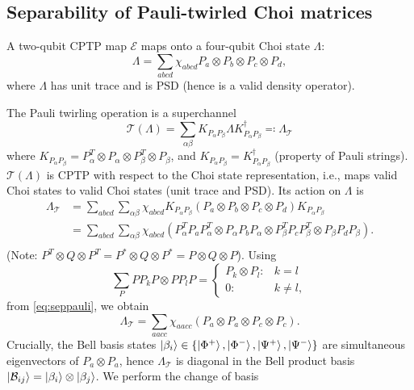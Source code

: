 \documentclass{article}
\begin{document}
\subsection{Separability of Pauli-twirled Choi matrices}
A two-qubit CPTP map $\mathcal{E}$ maps onto a four-qubit Choi state $\Lambda$:
\begin{equation}
    \Lambda = \sum_{abcd} \chi_{abcd} P_a\otimes P_b \otimes P_c \otimes P_d,
\end{equation}
where $\Lambda$ has unit trace and is PSD (hence is a valid density operator).

The Pauli twirling operation is a superchannel
\begin{equation}
    \mathcal{T}(\Lambda) = \sum_{\alpha \beta} K_{P_\alpha P_\beta}\Lambda K_{P_\alpha P_\beta}^\dagger \eqcolon \Lambda_\mathcal{T}
\end{equation}
where $K_{P_\alpha P_\beta}=P_\alpha^T\otimes P_\alpha  \otimes P_\beta^T \otimes P_\beta$, and $K_{P_\alpha P_\beta} = K_{P_\alpha P_\beta}^\dagger$ (property of Pauli strings). $\mathcal{T}(\Lambda)$ is CPTP with respect to the Choi state representation, i.e., maps valid Choi states to valid Choi states (unit trace and PSD). Its action on $\Lambda$ is
\begin{equation}\label{eq:seppauli}
    \begin{split}
    \Lambda_\mathcal{T} &= \sum_{abcd}\sum_{\alpha \beta} \chi_{abcd} K_{P_\alpha P_\beta}(P_a\otimes P_b \otimes P_c \otimes P_d)K_{P_\alpha P_\beta} \\
    &= \sum_{abcd}\sum_{\alpha \beta} \chi_{abcd} (P_\alpha^TP_aP_\alpha^T\otimes P_\alpha P_bP_\alpha \otimes P_\beta^TP_cP_\beta^T \otimes P_\beta P_dP_\beta). \\
    \end{split}
\end{equation}
(Note: $P^T\otimes Q\otimes P^T=P^*\otimes Q\otimes P^*=P\otimes Q\otimes P$). Using
\begin{equation}
    \sum_P P P_k P \otimes P P_l P = 
    \begin{cases}
        P_k \otimes P_l : & k=l \\
        0 : & k\neq l,
    \end{cases}
\end{equation}
from \cref{eq:seppauli}, we obtain
\begin{equation}
    \Lambda_\mathcal{T} = \sum_{aacc}\chi_{aacc} (P_a\otimes P_a \otimes P_c\otimes P_c).
\end{equation}
Crucially, the Bell basis states $\ket{\beta_i} \in \{\ket{\Phi^+}, \ket{\Phi^-}, \ket{\Psi^+}, \ket{\Psi^-}\}$ are simultaneous eigenvectors of $P_a \otimes P_a$, hence $\Lambda_\mathcal{T}$ is diagonal in the Bell product basis $\ket{\mathcal{B}_{ij}} =\ket{\beta_i} \otimes \ket{\beta_j}$. We perform the change of basis
\end{document}
